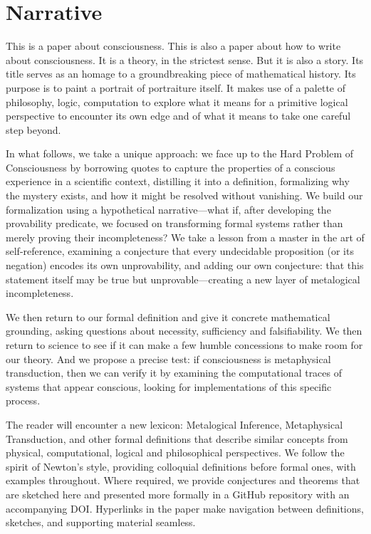 \documentclass[runningheads]{llncs}
\begin{document}
\section{Narrative}

This is a paper about consciousness. This is also a paper about how to write about consciousness. It is a theory, in the strictest sense. But it is also a story. Its title serves as an homage to a groundbreaking piece of mathematical history. Its purpose is to paint a portrait of portraiture itself. It makes use of a palette of philosophy, logic, computation to explore what it means for a primitive logical perspective to encounter its own edge and of what it means to take one careful step beyond.

In what follows, we take a unique approach: we face up to the Hard Problem of Consciousness by borrowing quotes to capture the properties of a conscious experience in a scientific context, distilling it into a definition, formalizing why the mystery exists, and how it might be resolved without vanishing. We build our formalization using a hypothetical narrative—what if, after developing the provability predicate, we focused on transforming formal systems rather than merely proving their incompleteness? We take a lesson from a master in the art of self-reference, examining a conjecture that every undecidable proposition (or its negation) encodes its own unprovability, and adding our own conjecture: that this statement itself may be true but unprovable—creating a new layer of metalogical incompleteness.

We then return to our formal definition and give it concrete mathematical grounding, asking questions about necessity, sufficiency and falsifiability. We then return to science to see if it can make a few humble concessions to make room for our theory. And we propose a precise test: if consciousness is metaphysical transduction, then we can verify it by examining the computational traces of systems that appear conscious, looking for implementations of this specific process.

The reader will encounter a new lexicon: Metalogical Inference, Metaphysical Transduction, and other formal definitions that describe similar concepts from physical, computational, logical and philosophical perspectives. We follow the spirit of Newton's style, providing colloquial definitions before formal ones, with examples throughout. Where required, we provide conjectures and theorems that are sketched here and presented more formally in a GitHub repository with an accompanying DOI. Hyperlinks in the paper make navigation between definitions, sketches, and supporting material seamless.
\end{document}
